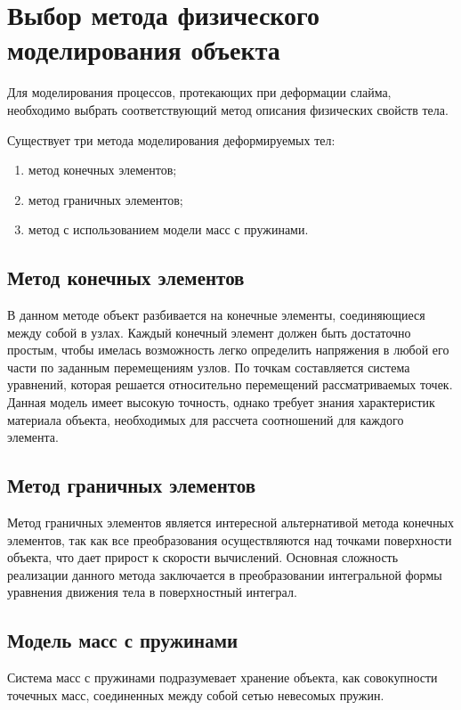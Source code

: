 \section{Выбор метода физического моделирования объекта}

Для моделирования процессов, протекающих при деформации слайма, необходимо выбрать соответствующий метод описания физических свойств тела.

Существует три метода моделирования деформируемых тел:

\begin{enumerate}
	\item метод конечных элементов;
	\item метод граничных элементов;
	\item метод с использованием модели масс с пружинами.
\end{enumerate}

\subsection{Метод конечных элементов}
В данном методе объект разбивается на конечные элементы, соединяющиеся
между собой в узлах. Каждый конечный элемент должен быть достаточно
простым, чтобы имелась возможность легко определить напряжения в любой его части по заданным перемещениям узлов. По точкам составляется система уравнений, которая решается относительно перемещений рассматриваемых точек. Данная модель имеет высокую точность, однако требует знания характеристик материала объекта, необходимых для рассчета соотношений для каждого элемента.

\subsection{Метод граничных элементов}
Метод граничных элементов является интересной альтернативой метода
конечных элементов, так как все преобразования осуществляются над точками
поверхности объекта, что дает прирост к скорости вычислений. Основная
сложность реализации данного метода заключается в преобразовании
интегральной формы уравнения движения тела в поверхностный интеграл.

\subsection{Модель масс с пружинами}
Система масс с пружинами подразумевает хранение объекта, как совокупности точечных масс, соединенных между собой сетью невесомых пружин.

